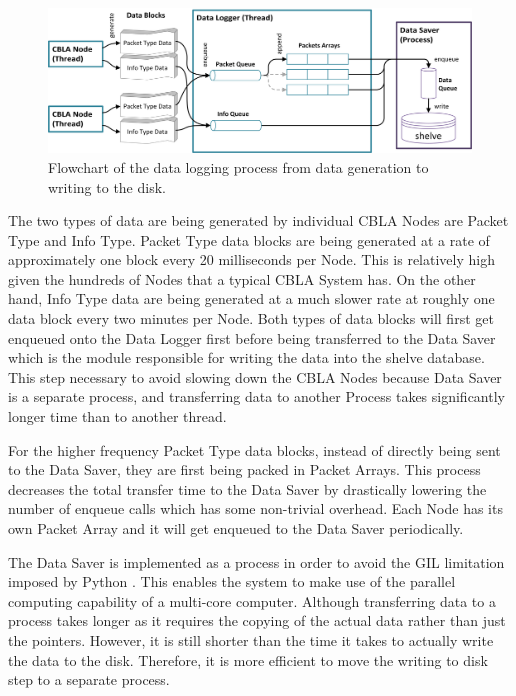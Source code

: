 \begin{figure}[!htbp]
	\centering
	\includegraphics[width=1.0 \textwidth]{"fig/interactive control system/DataLogger process"}
	\caption[Flowchart of the data logging process]{Flowchart of the data logging process from data generation to writing to the disk.}
	\label{fig:DataLogger process}
\end{figure}

The two types of data are being generated by individual CBLA Nodes are Packet Type and Info Type. Packet Type data blocks are being generated at a rate of approximately one block every 20 milliseconds per Node. This is relatively high given the hundreds of Nodes that a typical CBLA System has. On the other hand, Info Type data are being generated at a much slower rate at roughly one data block every two minutes per Node. Both types of data blocks will first get enqueued onto the  Data Logger first before being transferred to the Data Saver which is the module responsible for writing the data into the shelve database. This step necessary to avoid slowing down the CBLA Nodes because Data Saver is a separate process, and transferring data to another Process takes significantly longer time than to another thread. 

For the higher frequency Packet Type data blocks, instead of directly being sent to the Data Saver, they are first being packed in Packet Arrays. This process decreases the total transfer time to the Data Saver by drastically lowering the number of enqueue calls which has some non-trivial overhead. Each Node has its own Packet Array and it will get enqueued to the Data Saver periodically. 

The Data Saver is implemented as a process in order to avoid the GIL limitation imposed by Python \cite{Beazley2005}. This enables the system to make use of the parallel computing capability of a multi-core computer. Although transferring data to a process takes longer as it requires the copying of the actual data rather than just the pointers. However, it is still shorter than the time it takes to actually write the data to the disk. Therefore, it is more efficient to move the writing to disk step to a separate process.

